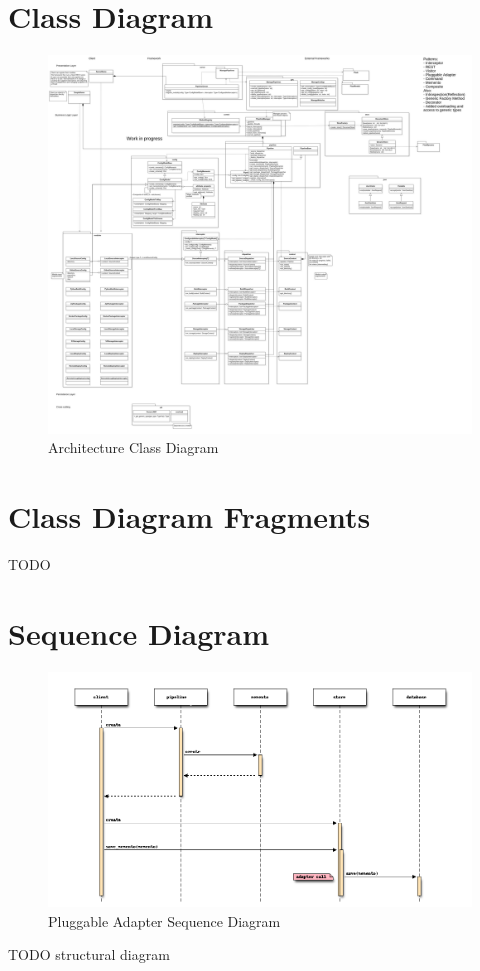   \section{Class Diagram}
    \begin{figure}[H]
        \includegraphics[width = 1.2\linewidth]{diagrams/architecture_classes.png}
        \caption{Architecture Class Diagram}
        \label{fig:architecture_classes}
      \end{figure}

    \section{Class Diagram Fragments}
    TODO
    
   
   \section{Sequence Diagram}
	   \begin{figure}[H]
	   	\includegraphics[width = 1.2\linewidth]{diagrams/sequence_diagram.png}
	   	\caption{Pluggable Adapter Sequence Diagram}
	   \end{figure}

TODO structural diagram
